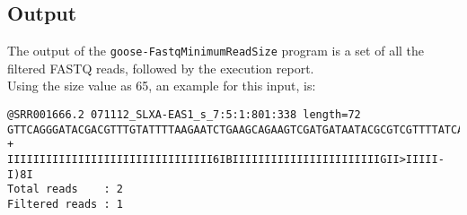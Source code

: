 \subsection*{Output}
The output of the \texttt{goose-FastqMinimumReadSize} program is a set of all the filtered FASTQ reads, followed by the execution report.\\
Using the size value as 65, an example for this input, is:
\begin{lstlisting}
@SRR001666.2 071112_SLXA-EAS1_s_7:5:1:801:338 length=72
GTTCAGGGATACGACGTTTGTATTTTAAGAATCTGAAGCAGAAGTCGATGATAATACGCGTCGTTTTATCAT
+
IIIIIIIIIIIIIIIIIIIIIIIIIIIIIIII6IBIIIIIIIIIIIIIIIIIIIIIIIGII>IIIII-I)8I
Total reads    : 2
Filtered reads : 1
\end{lstlisting}
